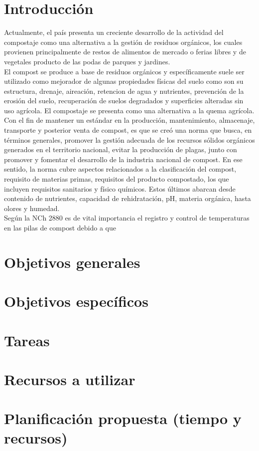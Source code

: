 \documentclass[12pt, letterpaper]{article}
\begin{document}
\section{Introducción}
Actualmente, el país presenta un creciente desarrollo de la actividad del compostaje como una alternativa a la gestión de residuos orgánicos, los cuales provienen principalmente de restos de alimentos de mercado o ferias libres y de vegetales producto de las podas de parques y jardines. \\
El compost se produce a base de residuos orgánicos y específicamente suele ser utilizado como mejorador de algunas propiedades físicas del suelo como son su estructura, drenaje, aireación, retencion de agua y nutrientes, prevención de la erosión del suelo, recuperación de suelos degradados y superficies alteradas sin uso agrícola. El compostaje se presenta como una alternativa a la quema agrícola.\\
Con el fin de mantener un estándar en la producción, mantenimiento, almacenaje, transporte y posterior venta de compost, es que se creó una norma que busca, en términos generales, promover la gestión adecuada de los recursos sólidos orgánicos generados en el territorio nacional, evitar la producción de plagas, junto con promover y fomentar el desarrollo de la industria nacional de compost. En ese sentido, la norma cubre aspectos relacionados a la clasificación del compost, requisito de materias primas, requisitos del producto compostado, los que incluyen requisitos sanitarios y físico químicos. Estos últimos abarcan desde contenido de nutrientes, capacidad de rehidratación, pH, materia orgánica, hasta olores y humedad.\\
Según la NCh 2880 es de vital importancia el registro y control de temperaturas en las pilas de compost debido a que





\section{Objetivos generales}

\section{Objetivos específicos}

\section{Tareas}

\section{Recursos a utilizar}

\section{Planificación propuesta (tiempo y recursos)}
\end{document}
